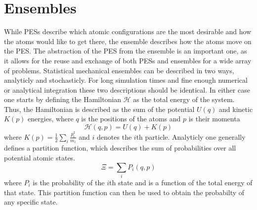 \section{Ensembles}
While PESs describe which atomic configurations are the most desirable and how the atoms would like to get there, the ensemble describes how the atoms move on the PES.
The abstraction of the PES from the ensemble is an important one, as it allows for the reuse and exchange of both PESs and ensembles for a wide array of problems.
Statistical mechanical ensembles can be described in two ways, analyticly and stochasticly.
For long simulation times and fine enough numerical or analytical integration these two descriptions should be identical.
In either case one starts by defining the Hamiltonian $\mathcal{H}$ as the total energy of the system.
Thus, the Hamiltonian is described as the sum of the potential $U(q)$ and kinetic $K(p)$ energies, where $q$ is the positions of the atoms and $p$ is their momenta
\begin{equation} \label{Hamiltonian}
  \mathcal{H}(q, p) = U(q) + K(p)
\end{equation}
\noindent where $K(p) = \frac{1}{2}\sum_{i} \frac{p_{i}^{2}}{m_{i}}$ and $i$ denotes the $i$th particle.
Analyticly one generally defines a partition function, which describes the sum of probabilities over all potential atomic states.
\[
\Xi = \sum_{i} P_{i}(q, p)
\]
where $P_{i}$ is the probability of the $i$th state and is a function of the total energy of that state.
This partition function can then be used to obtain the probabilty of any specific state.
